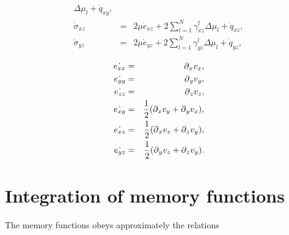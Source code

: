 \documentclass[11pt]{article}
\begin{document}
{\begin{eqnarray}
          \Delta\mu_l+\dot{q}_{xy}                                \nonumber,\\
  \dot{\sigma}_{xz} 
    & = & 2\mu \dot{e}_{xz} + 2\sum_{l=1}^N\gamma^l_{xz}
          \Delta\mu_l+\dot{q}_{xz}                                \nonumber,\\
  \dot{\sigma}_{yz} 
    & = & 2\mu \dot{e}_{yz} + 2\sum_{l=1}^N\gamma^l_{yz}
          \Delta\mu_l+\dot{q}_{yz}                                \nonumber,\\
\end{eqnarray} 
\begin{eqnarray}
    \dot{e_{xx}} & = & \mbox{$\partial$}_x v_x, \nonumber\\
    \dot{e_{yy}} & = & \mbox{$\partial$}_y v_y, \nonumber\\
    \dot{e_{zz}} & = & \mbox{$\partial$}_z v_z, \nonumber\\
    \dot{e_{xy}} & = & \frac{1}{2}(\mbox{$\partial$}_x v_y + \mbox{$\partial$}_y v_x),\nonumber\\
    \dot{e_{xz}} & = & \frac{1}{2}(\mbox{$\partial$}_x v_z + \mbox{$\partial$}_z v_y),\nonumber\\
    \dot{e_{yz}} & = & \frac{1}{2}(\mbox{$\partial$}_y v_z + \mbox{$\partial$}_z v_y).\nonumber\\
\end{eqnarray}

\section*{Integration of memory functions}
The memory functions  obeys approximately the relations

}
\end{document}
